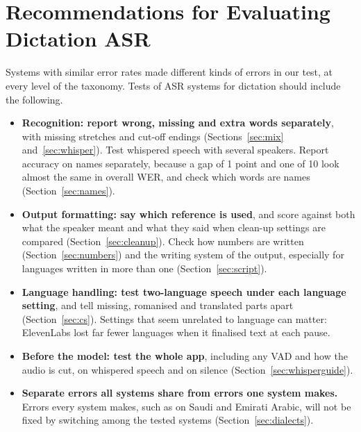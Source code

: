 \documentclass[11pt]{article}
\begin{document}
\section{Recommendations for Evaluating Dictation ASR}\label{sec:guidance}
Systems with similar error rates made different kinds of errors in our test, at every level of the taxonomy. Tests of ASR systems for dictation should include the following.
\begin{itemize}\itemsep1pt
  \item \textbf{Recognition: report wrong, missing and extra words separately}, with missing stretches and cut-off endings (Sections~\ref{sec:mix} and~\ref{sec:whisper}). Test whispered speech with several speakers. Report accuracy on names separately, because a gap of 1 point and one of 10 look almost the same in overall WER, and check which words are names (Section~\ref{sec:names}).
  \item \textbf{Output formatting: say which reference is used}, and score against both what the speaker meant and what they said when clean-up settings are compared (Section~\ref{sec:cleanup}). Check how numbers are written (Section~\ref{sec:numbers}) and the writing system of the output, especially for languages written in more than one (Section~\ref{sec:script}).
  \item \textbf{Language handling: test two-language speech under each language setting}, and tell missing, romanised and translated parts apart (Section~\ref{sec:cs}). Settings that seem unrelated to language can matter: ElevenLabs lost far fewer languages when it finalised text at each pause.
  \item \textbf{Before the model: test the whole app}, including any VAD and how the audio is cut, on whispered speech and on silence (Section~\ref{sec:whisperguide}).
  \item \textbf{Separate errors all systems share from errors one system makes.} Errors every system makes, such as on Saudi and Emirati Arabic, will not be fixed by switching among the tested systems (Section~\ref{sec:dialects}).
\end{itemize}

\FloatBarrier
\end{document}
